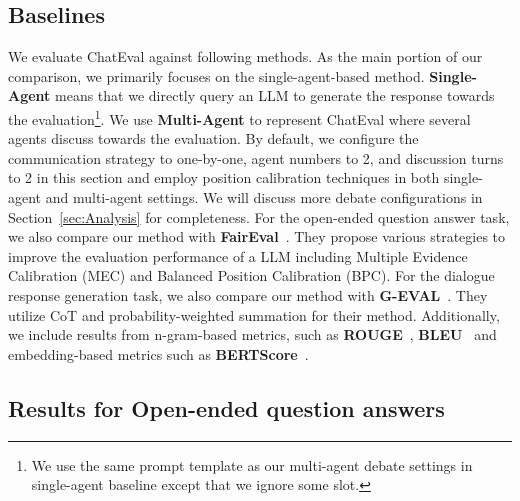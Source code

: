 \subsection{Baselines}

We evaluate ChatEval against following methods. As the main portion of our comparison, we primarily focuses on the single-agent-based method. \textbf{Single-Agent} means that we directly query an LLM to generate the response towards the evaluation\footnote{We use the same prompt template as our multi-agent debate settings in single-agent baseline except that we ignore some slot.}. We use \textbf{Multi-Agent} to represent ChatEval where several agents discuss towards the evaluation. By default, we configure the communication strategy to one-by-one, agent numbers to 2, and discussion turns to 2 in this section and employ position calibration techniques in both single-agent and multi-agent settings. We will discuss more debate configurations in Section~\ref{sec:Analysis} for completeness. For the open-ended question answer task, we also compare our method with \textbf{FairEval}~\citep{wang2023large}. They propose various strategies to improve the evaluation performance of a LLM including Multiple Evidence Calibration (MEC) and Balanced Position Calibration (BPC). For the dialogue response generation task, we also compare our method with \textbf{G-EVAL}~\citep{liu2023gpteval}. They utilize CoT and probability-weighted summation for their method. Additionally, we include results from n-gram-based metrics, such as \textbf{ROUGE}~\citep{lin2004rouge}, \textbf{BLEU}~\citep{papineni2002bleu} and embedding-based metrics such as \textbf{BERTScore}~\citep{zhang2019bertscore}.



\subsection{Results for Open-ended question answers}\label{subsec:open_ended}

